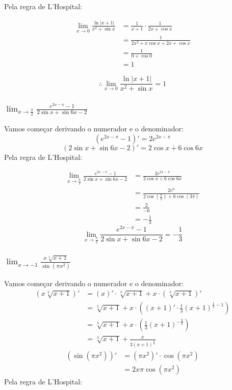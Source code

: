 \documentclass[12pt]{article}
\theoremstyle{definition}
\begin{document}
Pela regra de L'Hospital:

\begin{align*}
    \lim_{x\rightarrow 0}\frac{\ln{|x+1|}}{x^2+\sin{x}}
    &= \frac{1}{x+1}\cdot\frac{1}{2x+\cos{x}} \\
    &= \frac{1}{2x^2+x\cos{x}+2x+\cos{x}} \\
    &= \frac{1}{0+\cos{0}} \\
    &= 1
\end{align*}

\[
    \boxed{
        \therefore \lim_{x\rightarrow 0}\frac{\ln{|x+1|}}{x^2+\sin{x}} = 1
    }
\]

\subsubsection{\(\lim_{x\rightarrow \frac{\pi}{2}} \frac{e^{2x-\pi}-1}{2\sin{x}+\sin{6x}-2}\)}
Vamos começar derivando o numerador e o denominador:
\[
    (e^{2x-\pi}-1)' = 2e^{2x-\pi}
\]
\[
    (2\sin{x}+\sin{6x}-2)' = 2\cos{x} + 6\cos{6x}
\]
Pela regra de L'Hospital:

\begin{align*}
    \lim_{x\rightarrow \frac{\pi}{2}} \frac{e^{2x-\pi}-1}{2\sin{x}+\sin{6x}-2}
    &= \frac{2e^{2x-\pi}}{2\cos{x}+6\cos{6x}} \\
    &= \frac{2e^0}{2\cos{(\frac{\pi}{2})} +6\cos{(3\pi)}} \\
    &= \frac{2}{-6} \\
    &= -\frac{1}{3}
\end{align*}
\[
    \boxed{
        \lim_{x\rightarrow \frac{\pi}{2}} \frac{e^{2x-\pi}-1}{2\sin{x}+\sin{6x}-2} = -\frac{1}{3}
    }
\]

\subsubsection{\(\lim_{x\rightarrow -1} \frac{x\sqrt[3]{x+1}}{\sin{(\pi x^2)}}\)}
Vamos começar derivando o numerador e o denominador:
\begin{align*}
    (x\sqrt[3]{x+1})'
    &= (x)'\cdot \sqrt[3]{x+1} + x\cdot (\sqrt[3]{x+1})' \\
    &= \sqrt[3]{x+1} + x\cdot \left((x+1)' \cdot \frac{1}{3} {(x+1)}^{\frac{1}{3}-1}\right) \\
    &= \sqrt[3]{x+1} + x\cdot \left(\frac{1}{3} {(x+1)}^{-\frac{2}{3}}\right) \\
    &= \sqrt[3]{x+1} + \frac{x}{{3(x+1)}^{\frac{2}{3}}}
\end{align*}
\begin{align*}
    (\sin{(\pi x^2)})'
    &= (\pi x^2)' \cdot \cos{(\pi x^2)} \\
    &= 2x \pi \cos{(\pi x^2)}
\end{align*}
Pela regra de L'Hospital:
\end{document}
